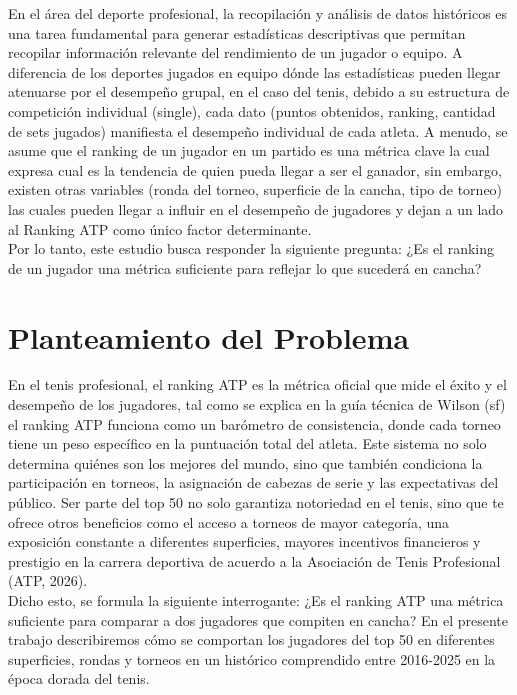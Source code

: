 \documentclass[oneside,11pt]{Latex/Classes/PhDthesisPSnPDF}
\begin{document}
En el área del deporte profesional, la recopilación y análisis de datos
históricos es una tarea fundamental para generar estadísticas
descriptivas que permitan recopilar información relevante del
rendimiento de un jugador o equipo. A diferencia de los deportes jugados
en equipo dónde las estadísticas pueden llegar atenuarse por el
desempeño grupal, en el caso del tenis, debido a su estructura de
competición individual (single), cada dato (puntos obtenidos, ranking,
cantidad de sets jugados) manifiesta el desempeño individual de cada
atleta. A menudo, se asume que el ranking de un jugador en un partido es
una métrica clave la cual expresa cual es la tendencia de quien pueda
llegar a ser el ganador, sin embargo, existen otras variables (ronda del
torneo, superficie de la cancha, tipo de torneo) las cuales pueden
llegar a influir en el desempeño de jugadores y dejan a un lado al
Ranking ATP como único factor determinante.\\

Por lo tanto, este estudio busca responder la siguiente pregunta: ¿Es el
ranking de un jugador una métrica suficiente para reflejar lo que
sucederá en cancha?

\chapter{Planteamiento del Problema}

En el tenis profesional, el ranking ATP es la métrica oficial que mide
el éxito y el desempeño de los jugadores, tal como se explica en la guía
técnica de Wilson (sf) el ranking ATP funciona como un barómetro de
consistencia, donde cada torneo tiene un peso específico en la
puntuación total del atleta. Este sistema no solo determina quiénes son
los mejores del mundo, sino que también condiciona la participación en
torneos, la asignación de cabezas de serie y las expectativas del
público. Ser parte del top 50 no solo garantiza notoriedad en el tenis,
sino que te ofrece otros beneficios como el acceso a torneos de mayor
categoría, una exposición constante a diferentes superficies, mayores
incentivos financieros y prestigio en la carrera deportiva de acuerdo a
la Asociación de Tenis Profesional (ATP, 2026).\\

Dicho esto, se formula la siguiente interrogante: ¿Es el ranking ATP una
métrica suficiente para comparar a dos jugadores que compiten en cancha?
En el presente trabajo describiremos cómo se comportan los jugadores del
top 50 en diferentes superficies, rondas y torneos en un histórico
comprendido entre 2016-2025 en la época dorada del tenis.\\
\end{document}
